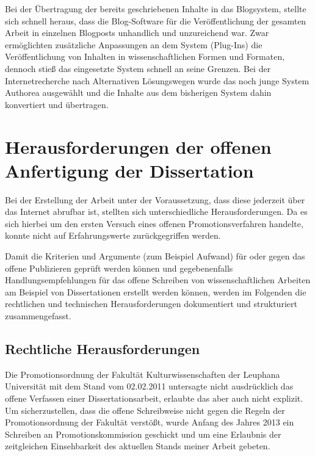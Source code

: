 Bei der Übertragung der bereits geschriebenen Inhalte in das Blogsystem, stellte sich schnell heraus, dass die Blog-Software für die Veröffentlichung der gesamten Arbeit in einzelnen Blogposts unhandlich und unzureichend war. Zwar ermöglichten zusätzliche Anpassungen an dem System (Plug-Ins) die Veröffentlichung von Inhalten in wissenschaftlichen Formen und Formaten, dennoch stieß das eingesetzte System schnell an seine Grenzen. Bei der Internetrecherche nach Alternativen Lösungswegen wurde das noch junge System Authorea ausgewählt und die Inhalte aus dem bisherigen System dahin konvertiert und übertragen.

\section{Herausforderungen der offenen Anfertigung der Dissertation}

Bei der Erstellung der Arbeit unter der Voraussetzung, dass diese jederzeit über das Internet abrufbar ist, stellten sich unterschiedliche Herausforderungen. Da es sich hierbei um den ersten Versuch eines offenen Promotionsverfahren handelte, konnte nicht auf Erfahrungswerte zurückgegriffen werden.

Damit die Kriterien und Argumente (zum Beispiel Aufwand) für oder gegen das offene Publizieren geprüft werden können und gegebenenfalls Handlungsempfehlungen für das offene Schreiben von wissenschaftlichen Arbeiten am Beispiel von Dissertationen erstellt werden können, werden im Folgenden die rechtlichen und technischen Herausforderungen dokumentiert und strukturiert zusammengefasst.

\subsection{Rechtliche Herausforderungen}

Die Promotionsordnung der Fakultät Kulturwissenschaften der Leuphana Universität mit dem Stand vom 02.02.2011 untersagte nicht ausdrücklich das offene Verfassen einer Dissertationsarbeit, erlaubte das aber auch nicht explizit. Um sicherzustellen, dass die offene Schreibweise nicht gegen die Regeln der Promotionsordnung der Fakultät verstößt, wurde Anfang des Jahres 2013 ein Schreiben an Promotionskommission geschickt und um eine Erlaubnis der zeitgleichen Einsehbarkeit des aktuellen Stands meiner Arbeit gebeten.

